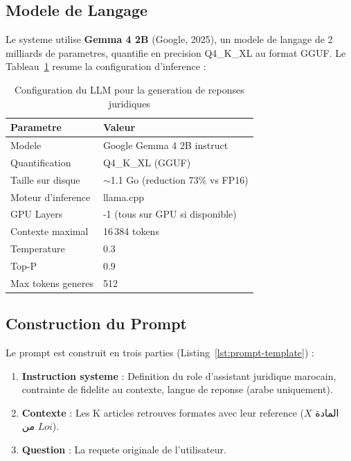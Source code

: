 \subsection{Modele de Langage}

Le systeme utilise \textbf{Gemma 4 2B} (Google, 2025), un modele de langage de 2 milliards de parametres, quantifie en precision Q4\_K\_XL au format GGUF. Le Tableau~\ref{tab:llm-config} resume la configuration d'inference :

\begin{table}[h]
\centering
\renewcommand{\arraystretch}{1.3}
\begin{tabular}{|l|l|}
\hline
\rowcolor{LightBlue}
\textbf{\color{PrimaryBlue}Parametre} & \textbf{\color{PrimaryBlue}Valeur} \\
\hline
Modele & Google Gemma 4 2B instruct \\
Quantification & Q4\_K\_XL (GGUF) \\
Taille sur disque & $\sim$1.1 Go (reduction 73\% vs FP16) \\
Moteur d'inference & llama.cpp \\
GPU Layers & -1 (tous sur GPU si disponible) \\
Contexte maximal & 16\,384 tokens \\
Temperature & 0.3 \\
Top-P & 0.9 \\
Max tokens generes & 512 \\
\hline
\end{tabular}
\caption{Configuration du LLM pour la generation de reponses juridiques}
\label{tab:llm-config}
\end{table}

\subsection{Construction du Prompt}

Le prompt est construit en trois parties (Listing~\ref{lst:prompt-template}) :

\begin{enumerate}
    \item \textbf{Instruction systeme} : Definition du role d'assistant juridique marocain, contrainte de fidelite au contexte, langue de reponse (arabe uniquement).
    \item \textbf{Contexte} : Les K articles retrouves formates avec leur reference (\textarabic{المادة} $X$ \textarabic{من} $Loi$).
    \item \textbf{Question} : La requete originale de l'utilisateur.
\end{enumerate}

